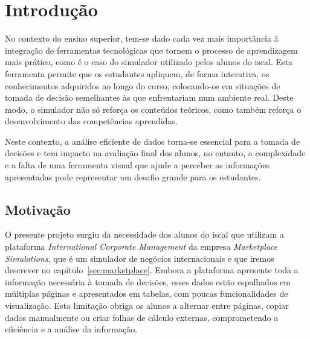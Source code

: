 

\chapter{Introdução}
\label{ch:introducao}

No contexto do ensino superior, tem-se dado cada vez mais importância à integração de ferramentas tecnológicas que tornem o processo de aprendizagem mais prático, como é o caso do simulador utilizado pelos alunos do \gls{iscal}. Esta ferramenta permite que os estudantes apliquem, de forma interativa, os conhecimentos adquiridos ao longo do curso, colocando-os em situações de tomada de decisão semelhantes às que enfrentariam num ambiente real. Deste modo, o simulador não só reforça os conteúdos teóricos, como também reforça o desenvolvimento das competências aprendidas. 

Neste contexto, a análise eficiente de dados torna-se essencial para a tomada de decisões e tem impacto na avaliação final dos alunos, no entanto, a complexidade e a falta de uma ferramenta visual que ajude a perceber as informações apresentadas pode representar um desafio grande para os estudantes.

\section{Motivação}

O presente projeto surgiu da necessidade dos alunos do \gls{iscal} que utilizam a plataforma \textit{International Corporate Management} da empresa \textit{Marketplace Simulations}, que é um simulador de negócios internacionais e que iremos descrever no capítulo~\ref{sec:marketplace}. Embora a plataforma apresente toda a informação necessária à tomada de decisões, esses dados estão espalhados em múltiplas páginas e apresentados em tabelas, com poucas funcionalidades de visualização. Esta limitação obriga os alunos a alternar entre páginas, copiar dados manualmente ou criar folhas de cálculo externas, comprometendo a eficiência e a análise da informação.

